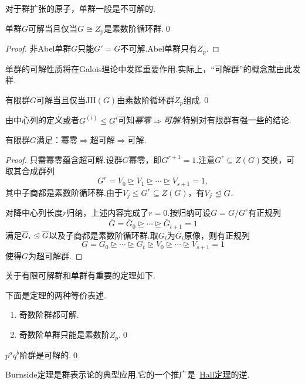 对于群扩张的原子，单群一般是不可解的.
\begin{prop}
	单群$G$可解当且仅当$G\cong Z_p$是素数阶循环群.\qed
\end{prop}
\begin{proof}
	非Abel单群$G$只能$G'=G$不可解.Abel单群只有$Z_p$.
\end{proof}
\begin{remark}
	单群的可解性质将在Galois理论中发挥重要作用.实际上，“可解群”的概念就由此发祥.%
\end{remark}
\begin{cor*}
	有限群$G$可解当且仅当$\mathrm{JH}(G)$由素数阶循环群$Z_p$组成.\qed
\end{cor*}

由中心列的定义或者$G^{(i)}\le G^i$可知\emph{幂零}$\Rightarrow$\emph{可解}.特别对有限群有强一些的结论.
\begin{prop}
	有限群$G$满足：幂零$\Rightarrow$超可解$\Rightarrow$可解.
\end{prop}
\begin{proof}
	只需幂零蕴含超可解.设群$G$幂零，即$G^{r+1}=1$.注意$G^r\subseteq Z(G)$交换，可取其合成群列
	\[
		G^r=V_0\trianglerighteq V_1\trianglerighteq\cdots\trianglerighteq V_{s+1}=1,
	\]
	其中子商都是素数阶循环群.由于$V_j\le G^r\subseteq Z(G)$，有$V_j\trianglelefteq G$.
	
	对降中心列长度$r$归纳，上述内容完成了$r=0$.按归纳可设$\overline{G}=G/G^r$有正规列
	\[
		\overline{G}=\overline{G}_0\trianglerighteq\cdots\trianglerighteq\overline{G}_{t+1}=1
	\]
	满足$\overline{G}_i\trianglelefteq\overline{G}$以及子商都是素数阶循环群.取$G_i$为$\overline{G}_i$原像，则有正规列
	\[
		G=G_0\trianglerighteq\cdots\trianglerighteq G_t\trianglerighteq V_0\trianglerighteq\cdots\trianglerighteq V_{s+1}=1
	\]
	使得$G$为超可解群.
\end{proof}

关于有限可解群和单群有重要的定理如下.
\begin{thm}
	下面是定理的两种等价表述.
	\begin{enumerate}
		\item 奇数阶群都可解.
		\item 奇数阶单群只能是素数阶$Z_p$.\qed
	\end{enumerate}
\end{thm}
\begin{thm}[(Burnside)]
	$p^aq^b$阶群是可解的.\qed
\end{thm}
\begin{remark}
	Burnside定理是群表示论的典型应用.它的一个推广是~\hyperlink{thm:Hall}{Hall定理}的逆.
\end{remark}

